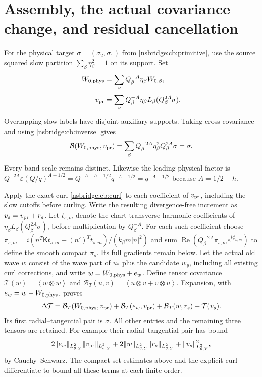 \documentclass[11pt]{article}
\newcommand{\av}[1]{\left\langle #1\right\rangle}
\newcommand{\Cross}{\mathcal B}
\begin{document}
\section{Assembly, the actual covariance change, and residual cancellation}
For the physical target $\sigma=(\sigma_2,\sigma_1)$ from
\eqref{nsbridge:cb:primitive}, use the source squared slow partition
$\sum_\beta\eta_\beta^2=1$ on its support. Set
\begin{align}
 W_{0,\rm phys}&=\sum_\beta Q_\beta^{-A}\eta_\beta W_{0,\beta},\nonumber\\
 v_{\rm pr}&=\sum_\beta Q_\beta^{-A}\eta_\beta
                        L_\beta(Q_\beta^{2A}\sigma).
 \label{nsbridge:cb:assembly}
\end{align}
Overlapping slow labels have disjoint auxiliary supports. Taking cross
covariance and using \eqref{nsbridge:cb:inverse} gives
\[
 \Cross(W_{0,\rm phys},v_{\rm pr})
 =\sum_\beta Q_\beta^{-2A}\eta_\beta^2Q_\beta^{2A}\sigma=\sigma.
\]
Every band scale remains distinct. Likewise the leading physical factor is
$Q^{-2A}\varepsilon(Q/q)^{A+1/2}
=Q^{-A+h+1/2}q^{-A-1/2}=q^{-A-1/2}$ because $A=1/2+h$.

Apply the exact curl \eqref{nsbridge:cb:curl} to each coefficient of
$v_{\rm pr}$, including the slow cutoffs before curling. Write the
resulting divergence-free increment as $v_s=v_{\rm pr}+r_s$.
Let $t_{s,m}$ denote the chart transverse harmonic coefficients of
$\eta_\beta L_\beta(Q_\beta^{2A}\sigma)$, before multiplication by
$Q_\beta^{-A}$. For each such coefficient choose
$\pi_{s,m}=i(n^T\mathsf Kt_{s,m}-(n')^Tt_{s,m})/
(k_\beta m|n|^2)$ and sum
$\operatorname{Re}(Q_\beta^{-2A}\pi_{s,m}e^{i\phi_{\beta,m}})$
to define the smooth compact $\pi_s$. Its full gradients remain below.
Let the actual old wave $w$ consist of the wave part of $u_*$
plus the candidate $w_y$, including all existing curl corrections, and write
$w=W_{0,\rm phys}+e_w$. Define tensor covariance
$\mathcal T(w)=\av{w\otimes w}$ and
$\mathcal B_T(u,v)=\av{u\otimes v+v\otimes u}$.
Expansion, with $e_w=w-W_{0,\rm phys}$, proves
\begin{equation}
 \Delta\mathcal T=
 \mathcal B_T(W_{0,\rm phys},v_{\rm pr})
 +\mathcal B_T(e_w,v_{\rm pr})
 +\mathcal B_T(w,r_s)+\mathcal T(v_s).
 \label{nsbridge:cb:fullcov}
\end{equation}
Its first radial--tangential pair is $\sigma$.
All other entries and the remaining three tensors are retained.
For example their radial--tangential pair has bound
\[
 2\|e_w\|_{L^2_{\theta,Y}}\|v_{\rm pr}\|_{L^2_{\theta,Y}}
 +2\|w\|_{L^2_{\theta,Y}}\|r_s\|_{L^2_{\theta,Y}}
 +\|v_s\|_{L^2_{\theta,Y}}^2 ,
\]
by Cauchy--Schwarz. The compact-set estimates above and the explicit
curl differentiate to bound all these terms at each finite order.
\end{document}
